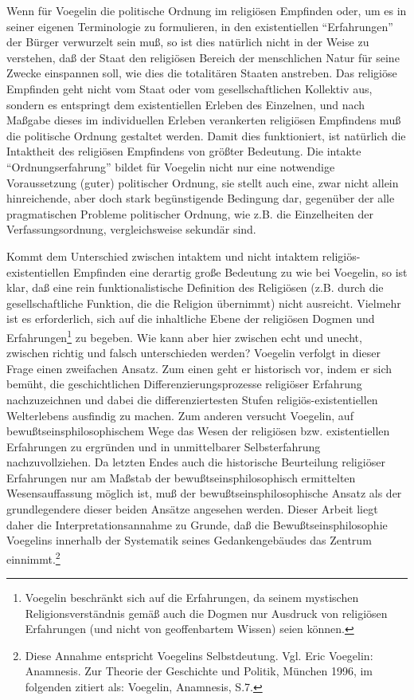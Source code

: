 Wenn für Voegelin die politische Ordnung im religiösen Empfinden oder,
um es in seiner eigenen Terminologie zu formulieren, in den
existentiellen "`Erfahrungen"' der Bürger verwurzelt sein muß, so ist
dies natürlich nicht in der Weise zu verstehen, daß der Staat den
religiösen Bereich der menschlichen Natur für seine Zwecke einspannen
soll, wie dies die totalitären Staaten anstreben. Das religiöse
Empfinden geht nicht vom Staat oder vom gesellschaftlichen Kollektiv
aus, sondern es entspringt dem existentiellen Erleben des Einzelnen, und
nach Maßgabe dieses im individuellen Erleben verankerten religiösen
Empfindens muß die politische Ordnung gestaltet werden.  Damit dies
funktioniert, ist natürlich die Intaktheit des religiösen Empfindens von
größter Bedeutung. Die intakte "`Ordnungserfahrung"' bildet für Voegelin
nicht nur eine notwendige Voraussetzung (guter) politischer Ordnung, sie
stellt auch eine, zwar nicht allein hinreichende, aber doch stark
begünstigende Bedingung dar, gegenüber der alle pragmatischen Probleme
politischer Ordnung, wie z.B. die Einzelheiten der Verfassungsordnung,
vergleichsweise sekundär sind.

Kommt dem Unterschied zwischen intaktem und nicht intaktem
religiös-existentiellen Empfinden eine derartig große Bedeutung zu wie
bei Voegelin, so ist klar, daß eine rein funktionalistische Definition
des Religiösen (z.B. durch die gesellschaftliche Funktion, die die
Religion übernimmt) nicht ausreicht. Vielmehr ist es erforderlich, sich
auf die inhaltliche Ebene der religiösen Dogmen und
Erfahrungen\footnote{Voegelin beschränkt sich auf die Erfahrungen, da
  seinem mystischen Religionsverständnis gemäß auch die Dogmen nur
  Ausdruck von religiösen Erfahrungen (und nicht von geoffenbartem
  Wissen) seien können.} zu begeben.  Wie kann aber hier zwischen echt
und unecht, zwischen richtig und falsch unterschieden werden?  Voegelin
verfolgt in dieser Frage einen zweifachen Ansatz. Zum einen geht er
historisch vor, indem er sich bemüht, die geschichtlichen
Differenzierungsprozesse religiöser Erfahrung nachzuzeichnen und dabei
die differenziertesten Stufen religiös-existentiellen Welterlebens
ausfindig zu machen. Zum anderen versucht Voegelin, auf
bewußtseinsphilosophischem Wege das Wesen der religiösen bzw.
existentiellen Erfahrungen zu ergründen und in unmittelbarer
Selbsterfahrung nachzuvollziehen. Da letzten Endes auch die historische
Beurteilung religiöser Erfahrungen nur am Maßstab der
bewußtseinsphilosophisch ermittelten Wesensauf\/fassung möglich ist, muß
der bewußtseinsphilosophische Ansatz als der grundlegendere dieser
beiden Ansätze angesehen werden. Dieser Arbeit liegt daher die
Interpretationsannahme zu Grunde, daß die Bewußtseinsphilosophie
Voegelins innerhalb der Systematik seines Gedankengebäudes das Zentrum
einnimmt.\footnote{Diese Annahme entspricht Voegelins Selbstdeutung.
  Vgl. Eric Voegelin: Anamnesis. Zur Theorie der Geschichte und Politik,
  München 1996, im folgenden zitiert als: Voegelin, Anamnesis, S.7.}

